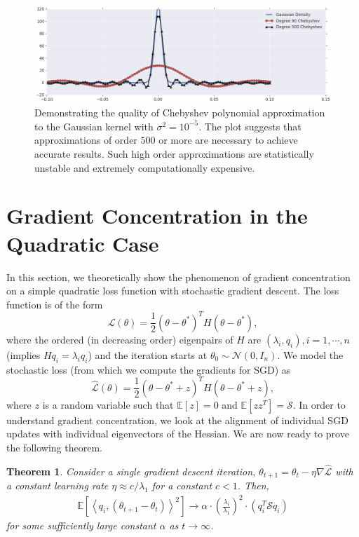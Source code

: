\documentclass{article}
\newtheorem{theorem}{Theorem}[section]
\newcommand{\loss}{\mathcal{L}}
\newcommand{\Noise}{\mathcal{S}}
\newcommand{\E}[1]{\mathbb{E}\left[#1\right]}
\begin{document}
\begin{figure}[h]
\includegraphics[width=\textwidth]{Approximations_to_the_Kernel.png}
\vspace{-0.5cm}
\caption{Demonstrating the quality of Chebyshev polynomial approximation to the Gaussian kernel with $\sigma^2 = 10^{-5}$. The plot suggests that approximations of order $500$ or more are necessary to achieve accurate results. Such high order approximations are statistically unstable and extremely computationally expensive. \label{fig:ChebyshevKernel}}
\end{figure}

\section{Gradient Concentration in the Quadratic Case}
\label{app:gradient_capture}

In this section, we theoretically show the phenomenon of gradient concentration on a simple quadratic loss function with stochastic gradient descent. The loss function is of the form 
$$\loss(\theta) = \frac{1}{2} (\theta-\theta^*)^T H (\theta-\theta^*),
$$ 
where the ordered (in decreasing order) eigenpairs of $H$ are $(\lambda_i, q_i), i = 1, \cdots, n$ (implies $H q_i = \lambda_i q_i$) and the iteration starts at $\theta_0 \sim \mathcal{N}(0, I_n)$. We model the stochastic loss (from which we compute the gradients for SGD) as 
$$\hat{\loss}(\theta) = \frac{1}{2} (\theta - \theta^* + z)^T H (\theta - \theta^* + z),
$$
where $z$ is a random variable such that $\E{z} = 0$ and $\E{zz^T} = \Noise$. In order to understand gradient concentration, we look at the alignment of individual SGD updates with individual eigenvectors of the Hessian. We are now ready to prove the following theorem.

\begin{theorem}\label{thm:quadratic}
 Consider a single gradient descent iteration, $\theta_{t+1} = \theta_t - \eta \nabla \hat{\loss}$ with a constant learning rate $\eta \approx c/\lambda_1$ for a constant $c < 1$. Then,
 \begin{align}
     \E{\left< q_i, (\theta_{t+1} - \theta_t) \right>^2} \to \alpha \cdot \left( \frac{\lambda_i}{\lambda_1} \right)^2 \cdot (q_i^T \Noise q_i)
 \end{align}
for some sufficiently large constant $\alpha$ as $t \to \infty$.
\end{theorem}
\end{document}
